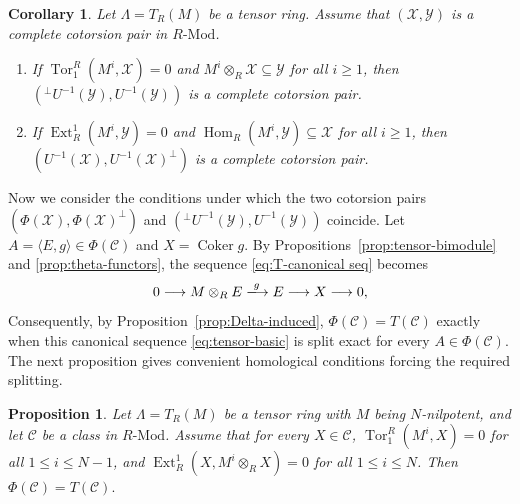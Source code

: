 \documentclass[11pt,reqno]{amsart}
\numberwithin{equation}{section}
\newtheorem{proposition}[theorem]{Proposition}
\newtheorem{corollary}[theorem]{Corollary}
\newcommand{\cX}{\mathcal X}
\newcommand{\cY}{\mathcal Y}
\newcommand{\cC}{\mathcal C}
\newcommand{\Ext}{\operatorname{Ext}}
\newcommand{\Hom}{\operatorname{Hom}}
\newcommand{\Tor}{\operatorname{Tor}}
\newcommand{\Coker}{\operatorname{Coker}}
\begin{document}
\begin{corollary}\label{thm:tensor-U-completeness}
Let $\Lambda = T_R(M)$ be a tensor ring. Assume that $(\cX,\cY)$ is a complete cotorsion pair in $R\text{-Mod}$.
\begin{enumerate}[label=\textup{(\arabic*)}]
\item If
$
\Tor_1^R(M^i,\cX)=0
$
and
$
M^i\otimes_R\cX\subseteq\cY
$ for all $i\ge 1$,
then $({}^\perp U^{-1}(\cY),U^{-1}(\cY))$ is a complete cotorsion pair.
\item If
$
\Ext_R^1(M^i,\cY)=0
$
and
$
\Hom_R(M^i,\cY)\subseteq\cX
$ for all $i\ge 1$,
then $(U^{-1}(\cX),U^{-1}(\cX)^\perp)$ is a complete cotorsion pair.
\end{enumerate}
\end{corollary}


Now we consider the conditions under which the two cotorsion pairs $(\Phi(\cX),\Phi(\cX)^\perp)$ and $({}^\perp U^{-1}(\cY), U^{-1}(\cY))$ coincide.
Let $A=\langle E,g\rangle\in\Phi(\cC)$ and $X=\Coker g$. By Propositions~\ref{prop:tensor-bimodule} and \ref{prop:theta-functors}, the sequence \eqref{eq:T-canonical seq} becomes
\begin{equation}\label{eq:tensor-basic}
0\longrightarrow M\otimes_RE
\xlongrightarrow{g}E
\longrightarrow X\longrightarrow0,
\end{equation}
Consequently, by Proposition~\ref{prop:Delta-induced}, $\Phi(\cC)=T(\cC)$ exactly when this canonical sequence \eqref{eq:tensor-basic}
is split exact for every $A\in\Phi(\cC)$. The next proposition gives convenient homological conditions forcing the required splitting.

\begin{proposition}\label{prop:tensor-Phi-T}
Let $\Lambda = T_R(M)$ be a tensor ring with $M$ being $N$-nilpotent, and let $\cC$ be a class in $R\text{-Mod}$. Assume that for every $X\in\cC$,
$\Tor_1^R(M^i,X)=0$ for all $1\le i\le N-1$,
and
$
\Ext_R^1(X,M^i\otimes_RX)=0$ for all $1\le i\le N$.
Then
$
\Phi(\cC)=T(\cC).
$
\end{proposition}
\end{document}
